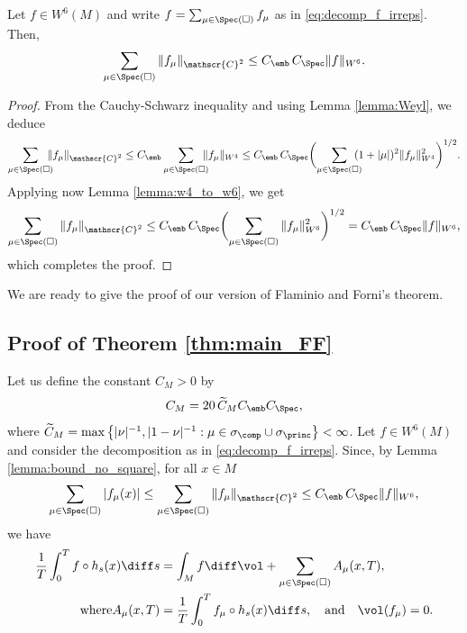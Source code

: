 \begin{lemma}\label{lemma:bound_no_square}
Let $f \in W^6(M)$ and write $f= \sum_{\mu \in \Spec(\square)} f_\mu$ as in \eqref{eq:decomp_f_irreps}. Then,
\[
\sum_{\mu \in \Spec(\square)} \|f_\mu\|_{\mathscr{C}^2} \leq C_{\emb} \, C_{\Spec} \|f\|_{W^6}.
\]
\end{lemma}
\begin{proof}
From the Cauchy-Schwarz inequality and using Lemma \ref{lemma:Weyl}, we deduce
\begin{equation*}
\sum_{\mu \in \Spec(\square)}\hspace*{-2.5mm} \|f_\mu\|_{\mathscr{C}^2} \leq C_{\emb} \sum_{\mu \in \Spec(\square)}\hspace*{-2.5mm} \|f_\mu\|_{W^4} \leq C_{\emb} \, C_{\Spec} \biggl(\sum_{\mu \in \Spec(\square)}\hspace*{-2.5mm} (1+|\mu|)^2 \|f_\mu\|^2_{W^4}\biggr)^{1/2}.
\end{equation*}
Applying now Lemma \ref{lemma:w4_to_w6}, we get
\[
\sum_{\mu \in \Spec(\square)} \|f_\mu\|_{\mathscr{C}^2} \leq C_{\emb} \, C_{\Spec} \biggl(\sum_{\mu \in \Spec(\square)} \|f_\mu\|^2_{W^6} \biggr)^{1/2} = C_{\emb} \, C_{\Spec} \|f\|_{W^6},
\]
which completes the proof.
\end{proof}

We are ready to give the proof of our version of Flaminio and Forni's theorem.

\subsection{Proof of Theorem \ref{thm:main_FF}}

Let us define the constant $C_M>0$ by
\begin{equation}\label{eq:defin_CM}
C_M = 20 \, {\widetilde C_M} C_{\emb} C_{\Spec}, 
\end{equation}
where $\widetilde C_M= \max \left\{ |\nu|^{-1}, |1-\nu|^{-1} : \mu \in \sigma_{\comp} \cup \sigma_{\princ} \right\} < \infty$.
Let $f \in W^6(M)$ and consider the decomposition as in \eqref{eq:decomp_f_irreps}.
Since, by Lemma \ref{lemma:bound_no_square}, for all $x \in M$
\[
\sum_{\mu \in \Spec(\square)} |f_\mu(x)|\leq \sum_{\mu \in \Spec(\square)} \|f_\mu\|_{\mathscr{C}^2} \leq C_{\emb} \, C_{\Spec} \|f\|_{W^6},
\]
we have
\begin{align}\label{eq:int_A}
\frac{1}{T} \int_0^T f \circ h_s(x) \diff s &= \int_M f \diff \vol + \sum_{\mu \in \Spec(\square) } A_{\mu}(x,T), \\
\tag*{where} A_{\mu}(x,T) &= \frac{1}{T} \int_0^T f_\mu \circ h_s(x) \diff s, \quad\text{and}\quad \vol(f_\mu)=0.
\end{align}

